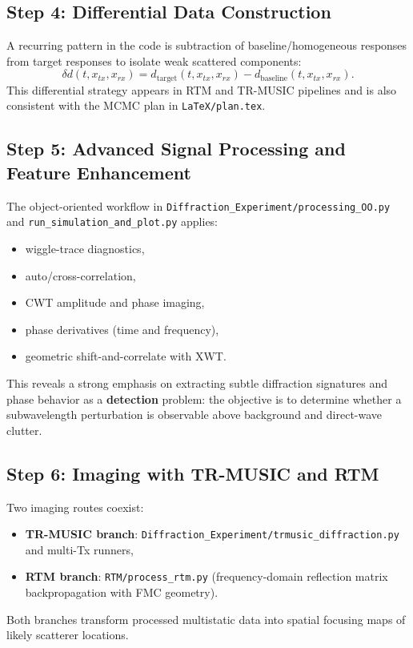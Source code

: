 \documentclass[11pt,a4paper]{article}
\newcommand{\repo}[1]{\texttt{#1}}
\begin{document}
\subsection*{Step 4: Differential Data Construction}
A recurring pattern in the code is subtraction of baseline/homogeneous responses from target responses to isolate weak scattered components:
\[
\delta d(t, x_{tx}, x_{rx}) = d_{\mathrm{target}}(t, x_{tx}, x_{rx}) - d_{\mathrm{baseline}}(t, x_{tx}, x_{rx}).
\]
This differential strategy appears in RTM and TR-MUSIC pipelines and is also consistent with the MCMC plan in \repo{LaTeX/plan.tex}.

\subsection*{Step 5: Advanced Signal Processing and Feature Enhancement}
The object-oriented workflow in \repo{Diffraction\_Experiment/processing\_OO.py} and \repo{run\_simulation\_and\_plot.py} applies:
\begin{itemize}
    \item wiggle-trace diagnostics,
    \item auto/cross-correlation,
    \item CWT amplitude and phase imaging,
    \item phase derivatives (time and frequency),
    \item geometric shift-and-correlate with XWT.
\end{itemize}
This reveals a strong emphasis on extracting subtle diffraction signatures and phase behavior as a \textbf{detection} problem: the objective is to determine whether a subwavelength perturbation is observable above background and direct-wave clutter.

\subsection*{Step 6: Imaging with TR-MUSIC and RTM}
Two imaging routes coexist:
\begin{itemize}
    \item \textbf{TR-MUSIC branch}: \repo{Diffraction\_Experiment/trmusic\_diffraction.py} and multi-Tx runners,
    \item \textbf{RTM branch}: \repo{RTM/process\_rtm.py} (frequency-domain reflection matrix backpropagation with FMC geometry).
\end{itemize}
Both branches transform processed multistatic data into spatial focusing maps of likely scatterer locations.
\end{document}

